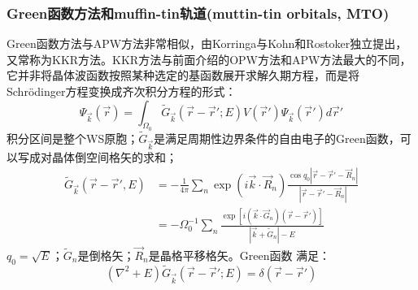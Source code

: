 \subsubsection{Green函数方法和muffin-tin轨道(muttin-tin orbitals, MTO)}
Green函数方法与APW方法非常相似，由Korringa\cite{P13-392_1947}与Kohn和Rostoker\cite{PR94-1111_1954}独立提出，又常称为KKR方法。KKR方法与前面介绍的OPW方法和APW方法最大的不同，它并非将晶体波函数按照某种选定的基函数展开求解久期方程，而是将Schr\"odinger方程变换成齐次积分方程的形式\cite{Ziman,Lizhengzhong}：
\begin{equation}
  \Psi_{\vec k}(\vec r)=\int_{\Omega_0}\tilde G_{\vec k}(\vec r-\vec r';E)V(\vec r')\Psi_{\vec k}(\vec r')d\vec r'
  \label{eq:solid-116}
\end{equation}
积分区间是整个WS原胞；$\tilde G_{\vec k}$是满足周期性边界条件的自由电子的Green函数，可以写成对晶体倒空间格矢的求和；
\begin{equation}
  \begin{split}
    \tilde G_{\vec k}(\vec r-\vec r',E)&=-\frac1{4\pi}\sum_n\exp(i\vec k\cdot\vec R_n)\frac{\cos q_0|\vec r-\vec r'-\vec R_n|}{|\vec r-\vec r'-\vec R_n|}\\
    &=-\Omega_0^{-1}\sum_n\frac{\exp[i(\vec k\cdot\vec G_n)(\vec r-\vec r')]}{|\vec k+\tilde G_n|-E}
  \end{split}
  \label{eq:solid-117}
\end{equation}
$q_0=\sqrt E$；$\tilde G_n$是倒格矢；$\vec R_n$是晶格平移格矢。Green函数
满足：
\begin{equation}
  (\nabla^2+E)\tilde G_{\vec k}(\vec r-\vec r';E)=\delta(\vec r-\vec r')
  \label{eq:solid-118}
\end{equation}

